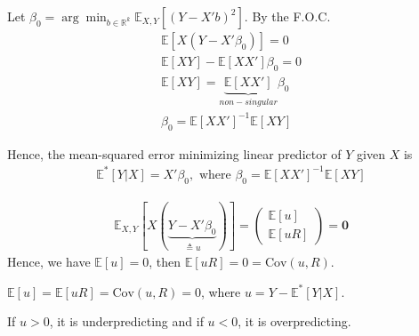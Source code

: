 \documentclass[11pt]{elegantbook}
\begin{document}
Let $\beta_0=\arg\min_{b\in \mathbb{R}^k}\mathbb{E}_{X,Y}[(Y-X'b)^2]$. By the F.O.C.
\begin{equation}
    \begin{aligned}
        \mathbb{E}[X(Y-X'\beta_0)]=0\\
        \mathbb{E}[XY]-\mathbb{E}[XX']\beta_0=0\\
        \mathbb{E}[XY]=\underbrace{\mathbb{E}[XX']}_{non-singular}\beta_0\\
        \beta_0=\mathbb{E}[XX']^{-1}\mathbb{E}[XY]
    \end{aligned}
    \nonumber
\end{equation}
\begin{proposition}
    Hence, the mean-squared error minimizing linear predictor of $Y$ given $X$ is
    \begin{equation}
        \begin{aligned}
            \mathbb{E}^*[Y|X]=X'\beta_0, \text{ where }\beta_0=\mathbb{E}[XX']^{-1}\mathbb{E}[XY]
        \end{aligned}
        \nonumber
    \end{equation}
\end{proposition}
\begin{equation}
    \begin{aligned}
        \mathbb{E}_{X,Y}[X(\underbrace{Y-X'\beta_0}_{\triangleq u})]=\begin{pmatrix}
            \mathbb{E}[u]\\
            \mathbb{E}[uR]
        \end{pmatrix}=\boldsymbol{0}
    \end{aligned}
    \nonumber
\end{equation}
Hence, we have $\mathbb{E}[u]=0$, then $\mathbb{E}[uR]=0=\text{Cov}(u,R)$.
\begin{lemma}
    $\mathbb{E}[u]=\mathbb{E}[uR]=\text{Cov}(u,R)=0$, where $u=Y-\mathbb{E}^*[Y|X]$.
\end{lemma}
If $u>0$, it is underpredicting and if $u<0$, it is overpredicting.
\end{document}

